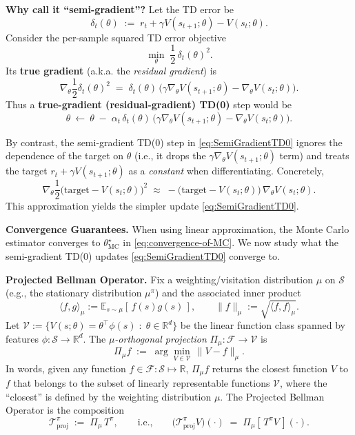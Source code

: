 \documentclass[
]{book}
\theoremstyle{definition}
\theoremstyle{definition}
\theoremstyle{definition}
\theoremstyle{definition}
\theoremstyle{remark}
\begin{document}
\textbf{Why call it ``semi-gradient''?} Let the TD error be
\[
\delta_t(\theta) \;:=\; r_t + \gamma V(s_{t+1};\theta) - V(s_t;\theta).
\]
Consider the per-sample squared TD error objective
\[
\min_{\theta}\; \frac{1}{2} \,\delta_t(\theta)^2.
\]
Its \textbf{true gradient} (a.k.a. the \emph{residual gradient}) is
\[
\nabla_\theta \frac{1}{2} \delta_t(\theta)^2
\;=\;
\delta_t(\theta)\,\big(\gamma \nabla_\theta V(s_{t+1};\theta) - \nabla_\theta V(s_t;\theta)\big).
\]
Thus a \textbf{true-gradient (residual-gradient) TD(0)} step would be
\begin{equation}
\theta \ \leftarrow\ \theta \;-\; \alpha_t \,\delta_t(\theta)\,\big(\gamma \nabla_\theta V(s_{t+1};\theta) - \nabla_\theta V(s_t;\theta)\big).
\label{eq:ResidualGradientTD0}
\end{equation}

By contrast, the semi-gradient TD(0) step in \eqref{eq:SemiGradientTD0} ignores the dependence of the target on \(\theta\) (i.e., it drops the \(\gamma \nabla_\theta V(s_{t+1};\theta)\) term) and treats the target \(r_t+\gamma V(s_{t+1};\theta)\) as a \emph{constant} when differentiating. Concretely,
\[
\nabla_\theta \frac{1}{2} \big( \text{target} - V(s_t;\theta)\big)^2
\;\approx\;
-\big(\text{target} - V(s_t;\theta)\big)\,\nabla_\theta V(s_t;\theta).
\]
This approximation yields the simpler update \eqref{eq:SemiGradientTD0}.

\textbf{Convergence Guarantees.} When using linear approximation, the Monte Carlo estimator converges to \(\theta^\star_{\text{MC}}\) in \eqref{eq:convergence-of-MC}. We now study what the semi-gradient TD(0) updates \eqref{eq:SemiGradientTD0} converge to.

\textbf{Projected Bellman Operator.} Fix a weighting/visitation distribution \(\mu\) on \(\mathcal S\) (e.g., the stationary distribution \(\mu^\pi\)) and the associated inner product
\[
\langle f,g\rangle_\mu := \mathbb{E}_{s\sim \mu}[\,f(s)g(s)\,], 
\qquad 
\|f\|_\mu := \sqrt{\langle f,f\rangle_\mu}.
\]
Let \(\mathcal V := \{V(s;\theta)=\theta^\top\phi(s)\;:\;\theta\in\mathbb{R}^d\}\) be the linear function class spanned by features \(\phi:\mathcal S\to\mathbb{R}^d\). The \emph{\(\mu\)-orthogonal projection} \(\Pi_\mu:\mathcal{F}\to\mathcal V\) is
\[
\Pi_\mu f \;:=\; \arg\min_{V\in\mathcal V}\, \| V - f\|_\mu .
\]
In words, given any function \(f \in \mathcal{F}: \mathcal{S} \mapsto \mathbb{R}\), \(\Pi_\mu f\) returns the closest function \(V\) to \(f\) that belongs to the subset of linearly representable functions \(\mathcal{V}\), where the ``closest'' is defined by the weighting distribution \(\mu\).
The Projected Bellman Operator is the composition
\begin{equation}
\mathcal{T}^\pi_{\!\text{proj}} \;:=\; \Pi_\mu \, T^\pi,
\qquad\text{i.e.,}\qquad
\big(\mathcal{T}^\pi_{\!\text{proj}} V\big)(\cdot) \;=\; \Pi_\mu \!\left[\, T^\pi V \,\right](\cdot).
\label{eq:ProjectedBellmanOperator}
\end{equation}
\end{document}
